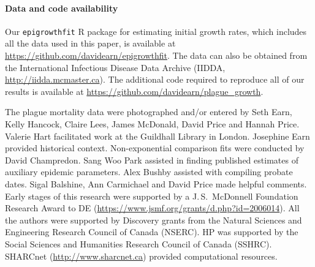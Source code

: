 \hypertarget{data.and.code}{}
\paragraph{Data and code availability}

Our \texttt{epigrowthfit} R package for estimating initial growth
rates, which includes all the data used in this paper, is available at
\url{https://github.com/davidearn/epigrowthfit}.  The data can also be
obtained from the International Infectious Disease Data Archive
(IIDDA, \url{http://iidda.mcmaster.ca}).  The additional code required
to reproduce all of our results is available at
\url{https://github.com/davidearn/plague_growth}.


The plague mortality data were photographed and/or entered by Seth Earn, Kelly Hancock, Claire Lees, James McDonald, David Price and Hannah Price.  Valerie Hart facilitated work at the Guildhall Library in London.  Josephine Earn provided historical context.  Non-exponential comparison fits were conducted by David Champredon.  Sang Woo Park assisted in finding published estimates of auxiliary epidemic parameters. Alex Bushby assisted with compiling probate dates. Sigal Balshine, Ann Carmichael and David Price made helpful comments.  Early stages of this research were supported by a J.\,S.~McDonnell Foundation Research Award to DE (\url{https://www.jsmf.org/grants/d.php?id=2006014}).  All the authors were supported by Discovery grants from the Natural Sciences and Engineering Research Council of Canada (NSERC). HP was supported by the Social Sciences and Humanities Research Council of Canada (SSHRC). SHARCnet (\url{http://www.sharcnet.ca}) provided computational resources.
